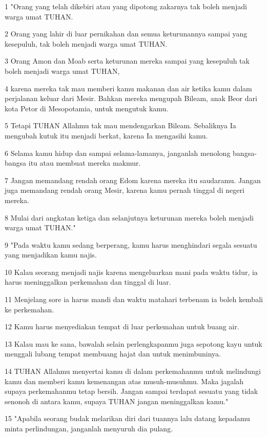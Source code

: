 \par 1 "Orang yang telah dikebiri atau yang dipotong zakarnya tak boleh menjadi warga umat TUHAN.
\par 2 Orang yang lahir di luar pernikahan dan semua keturunannya sampai yang kesepuluh, tak boleh menjadi warga umat TUHAN.
\par 3 Orang Amon dan Moab serta keturunan mereka sampai yang kesepuluh tak boleh menjadi warga umat TUHAN,
\par 4 karena mereka tak mau memberi kamu makanan dan air ketika kamu dalam perjalanan keluar dari Mesir. Bahkan mereka mengupah Bileam, anak Beor dari kota Petor di Mesopotamia, untuk mengutuk kamu.
\par 5 Tetapi TUHAN Allahmu tak mau mendengarkan Bileam. Sebaliknya Ia mengubah kutuk itu menjadi berkat, karena Ia mengasihi kamu.
\par 6 Selama kamu hidup dan sampai selama-lamanya, janganlah menolong bangsa-bangsa itu atau membuat mereka makmur.
\par 7 Jangan memandang rendah orang Edom karena mereka itu saudaramu. Jangan juga memandang rendah orang Mesir, karena kamu pernah tinggal di negeri mereka.
\par 8 Mulai dari angkatan ketiga dan selanjutnya keturunan mereka boleh menjadi warga umat TUHAN."
\par 9 "Pada waktu kamu sedang berperang, kamu harus menghindari segala sesuatu yang menjadikan kamu najis.
\par 10 Kalau seorang menjadi najis karena mengeluarkan mani pada waktu tidur, ia harus meninggalkan perkemahan dan tinggal di luar.
\par 11 Menjelang sore ia harus mandi dan waktu matahari terbenam ia boleh kembali ke perkemahan.
\par 12 Kamu harus menyediakan tempat di luar perkemahan untuk buang air.
\par 13 Kalau mau ke sana, bawalah selain perlengkapanmu juga sepotong kayu untuk menggali lubang tempat membuang hajat dan untuk menimbuninya.
\par 14 TUHAN Allahmu menyertai kamu di dalam perkemahanmu untuk melindungi kamu dan memberi kamu kemenangan atas musuh-musuhmu. Maka jagalah supaya perkemahanmu tetap bersih. Jangan sampai terdapat sesuatu yang tidak senonoh di antara kamu, supaya TUHAN jangan meninggalkan kamu."
\par 15 "Apabila seorang budak melarikan diri dari tuannya lalu datang kepadamu minta perlindungan, janganlah menyuruh dia pulang.

